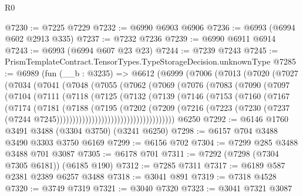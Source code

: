 \begin{lexlean}{R0}
\begin{coremodule}
@7230 := @7225 @7229
@7232 := @6990 @6903 @6906
@7236 := @6993 (@6994 @602 @2913 @335)
@7237 := @7232 @7236
@7239 := @6990 @6911 @6914
@7243 := @6993 (@6994 @607 @23 @23)
@7244 := @7239 @7243
@7245 := PrismTemplateContract.TensorTypes.TypeStorageDecision.unknownType
@7285 := @6989
    (fun (__b : @3235) =>
    @6612
      (@6999
        (@7006
          (@7013
            (@7020
              (@7027
                (@7034
                  (@7041
                    (@7048
                      (@7055
                        (@7062
                          (@7069
                            (@7076
                              (@7083
                                (@7090
                                  (@7097
                                    (@7104
                                      (@7111
                                        (@7118
                                          (@7125
                                            (@7132
                                              (@7139
                                                (@7146
                                                  (@7153
                                                    (@7160
                                                      (@7167
                                                        (@7174
                                                          (@7181
                                                            (@7188
                                                              (@7195
                                                                (@7202
                                                                  (@7209
                                                                    (@7216
                                                                      (@7223
                                                                        (@7230
                                                                          (@7237
                                                                            (@7244
                                                                              @7245)))))))))))))))))))))))))))))))))))))
    @6250
@7292 := @6146 @1760 @3491 @3488 (@3304 @3750) (@3241 @6250)
@7298 := @6157 @704 @3488 @3490 @3303 @3750 @6169
@7299 := @6156 @702
@7304 := @7299 @285 @3488 @3488 @701 @3087
@7305 := @6178 @701
@7311 := @7292 (@7298 (@7304 @7305 @6181)) (@6185 @190)
@7312 := @7285 @7311
@7317 := @6189 @587 @2381 @2389 @6257 @3488
@7318 := @3041 @891
@7319 := @7318 @4528
@7320 := @3749 @7319
@7321 := @3040 @7320
@7323 := @3041 @7321 @3087

\end{coremodule}
\end{lexlean}
